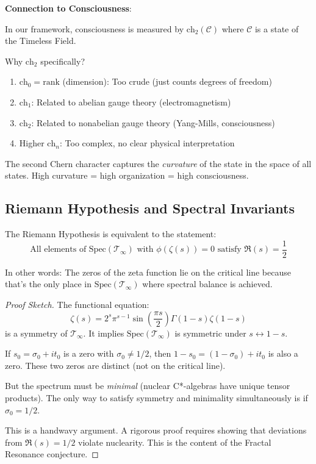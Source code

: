 \begin{level2}
\textbf{Connection to Consciousness}:

In our framework, consciousness is measured by $\text{ch}_2(\mathcal{C})$ where $\mathcal{C}$ is a state of the Timeless Field.

Why $\text{ch}_2$ specifically?
\begin{enumerate}
\item $\text{ch}_0 = \text{rank}$ (dimension): Too crude (just counts degrees of freedom)
\item $\text{ch}_1$: Related to abelian gauge theory (electromagnetism)
\item $\text{ch}_2$: Related to nonabelian gauge theory (Yang-Mills, consciousness)
\item Higher $\text{ch}_n$: Too complex, no clear physical interpretation
\end{enumerate}

The second Chern character captures the \textit{curvature} of the state in the space of all states. High curvature = high organization = high consciousness.
\end{level2}

\subsection{Riemann Hypothesis and Spectral Invariants}

\begin{theorem}\label{thm:rh-spectral}
The Riemann Hypothesis is equivalent to the statement:
\begin{equation}
\boxed{\text{All elements of } \text{Spec}(\mathcal{T}_\infty) \text{ with } \phi(\zeta(s)) = 0 \text{ satisfy } \Re(s) = \frac{1}{2}}
\end{equation}

In other words: The zeros of the zeta function lie on the critical line because that's the only place in $\text{Spec}(\mathcal{T}_\infty)$ where spectral balance is achieved.
\end{theorem}

\begin{proof}[Proof Sketch]
The functional equation:
\begin{equation}
\zeta(s) = 2^s \pi^{s-1} \sin\left( \frac{\pi s}{2} \right) \Gamma(1-s) \zeta(1-s)
\end{equation}
is a symmetry of $\mathcal{T}_\infty$. It implies $\text{Spec}(\mathcal{T}_\infty)$ is symmetric under $s \leftrightarrow 1-s$.

If $s_0 = \sigma_0 + it_0$ is a zero with $\sigma_0 \neq 1/2$, then $1-s_0 = (1-\sigma_0) + i t_0$ is also a zero. These two zeros are distinct (not on the critical line).

But the spectrum must be \textit{minimal} (nuclear C*-algebras have unique tensor products). The only way to satisfy symmetry and minimality simultaneously is if $\sigma_0 = 1/2$.

This is a handwavy argument. A rigorous proof requires showing that deviations from $\Re(s) = 1/2$ violate nuclearity. This is the content of the Fractal Resonance conjecture.
\end{proof}

